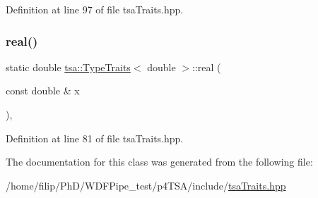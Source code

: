 Definition at line 97 of file tsa\+Traits.\+hpp.

\mbox{\label{classtsa_1_1_type_traits_3_01double_01_4_aacaf66bc787883b8cd043fa65a77ab2b}} 
\subsubsection{\texorpdfstring{real()}{real()}}
{\footnotesize\ttfamily static double \hyperlink{classtsa_1_1_type_traits}{tsa\+::\+Type\+Traits}$<$ double $>$\+::real (\begin{DoxyParamCaption}\item[{const double \&}]{x }\end{DoxyParamCaption})\hspace{0.3cm}{\ttfamily [inline]}, {\ttfamily [static]}}



Definition at line 81 of file tsa\+Traits.\+hpp.



The documentation for this class was generated from the following file\+:\begin{DoxyCompactItemize}
\item 
/home/filip/\+Ph\+D/\+W\+D\+F\+Pipe\+\_\+test/p4\+T\+S\+A/include/\hyperlink{tsa_traits_8hpp}{tsa\+Traits.\+hpp}\end{DoxyCompactItemize}
